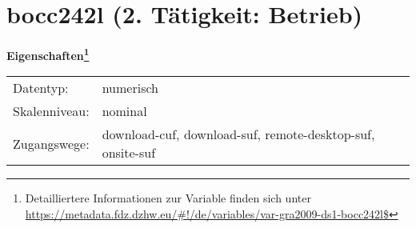 
    \setcounter{footnote}{0}

    \vspace*{-1.8cm}
	\section{bocc242l (2. Tätigkeit: Betrieb)}
	\label{section:bocc242l}



    \vspace*{0.5cm}
    \noindent\textbf{Eigenschaften\footnote{Detailliertere Informationen zur Variable finden sich unter
		\url{https://metadata.fdz.dzhw.eu/\#!/de/variables/var-gra2009-ds1-bocc242l$}}}\\
	\begin{tabularx}{\hsize}{@{}lX}
	Datentyp: & numerisch \\
	Skalenniveau: & nominal \\
	Zugangswege: &
	  download-cuf, 
	  download-suf, 
	  remote-desktop-suf, 
	  onsite-suf
 \\
    \end{tabularx}



